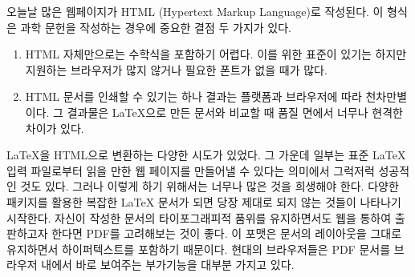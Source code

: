 오늘날 많은 웹페이지가 HTML (Hypertext Markup Language)로 작성된다.
이 형식은 과학 문헌을 작성하는 경우에 중요한 결점 두 가지가 있다.
\begin{enumerate}
\item HTML 자체만으로는 수학식을 포함하기 어렵다. 이를 위한 표준이 있기는 하지만 지원하는 브라우저가 많지 않거나 필요한 폰트가 없을 때가 많다.%
\item HTML 문서를 인쇄할 수 있기는 하나 결과는 플랫폼과 브라우저에 따라 천차만별이다. 그 결과물은 \LaTeX 으로 만든 문서와 비교할 때 품질 면에서 너무나 현격한 차이가 있다.
\end{enumerate}

\LaTeX 을 HTML으로 변환하는 다양한 시도가 있었다. 그 가운데 일부는 표준 \LaTeX{} 입력 파일로부터 읽을 만한 웹 페이지를 만들어낼 수 있다는 의미에서 그럭저럭 성공적인 것도 있다. 그러나 이렇게 하기 위해서는 너무나 많은 것을 희생해야 한다. 다양한 패키지를 활용한 복잡한 \LaTeX{} 문서가 되면 당장 제대로 되지 않는 것들이 나타나기 시작한다. 자신이 작성한 문서의 타이포그래피적 품위를 유지하면서도 웹을 통하여 출판하고자 한다면 PDF를 고려해보는 것이 좋다. 이 포맷은 문서의 레이아웃을 그대로 유지하면서 하이퍼텍스트를 포함하기 때문이다.
현대의 브라우저들은 PDF 문서를 브라우저 내에서 바로 보여주는 부가기능을 대부분 가지고 있다.

